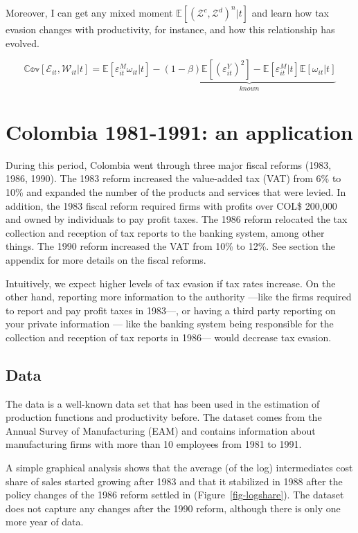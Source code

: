 \documentclass[
  12pt]{article}
\theoremstyle{definition}
\theoremstyle{remark}
\begin{document}
Moreover, I can get any mixed moment
\(\mathbb{E}[(\mathcal{Z}^c, \mathcal{Z}^d)^n|t]\) and learn how tax
evasion changes with productivity, for instance, and how this
relationship has evolved.

\[
\mathbb{Cov}[\mathcal{E}_{it},\mathcal{W}_{it}|t]=\mathbb{E}[\varepsilon^M_{it}\omega_{it}|t]
-\underbrace{
(1-\beta)\mathbb{E}[(\varepsilon^{Y}_{it})^2]-\mathbb{E}[\varepsilon^M_{it}|t]\mathbb{E}[\omega_{it}|t]}_{
known
}
\]

\hypertarget{colombia-1981-1991-an-application}{%
\section{Colombia 1981-1991: an
application}\label{colombia-1981-1991-an-application}}

During this period, Colombia went through three major fiscal reforms
(1983, 1986, 1990). The 1983 reform increased the value-added tax (VAT)
from 6\% to 10\% and expanded the number of the products and services
that were levied. In addition, the 1983 fiscal reform required firms
with profits over COL\$ 200,000 and owned by individuals to pay profit
taxes. The 1986 reform relocated the tax collection and reception of tax
reports to the banking system, among other things. The 1990 reform
increased the VAT from 10\% to 12\%. See section the appendix for more
details on the fiscal reforms.

Intuitively, we expect higher levels of tax evasion if tax rates
increase. On the other hand, reporting more information to the authority
---like the firms required to report and pay profit taxes in 1983---, or
having a third party reporting on your private information --- like the
banking system being responsible for the collection and reception of tax
reports in 1986--- would decrease tax evasion.

\hypertarget{data}{%
\subsection{Data}\label{data}}

The data is a well-known data set that has been used in the estimation
of production functions and productivity before. The dataset comes from
the Annual Survey of Manufacturing (EAM) and contains information about
manufacturing firms with more than 10 employees from 1981 to 1991.

A simple graphical analysis shows that the average (of the log)
intermediates cost share of sales started growing after 1983 and that it
stabilized in 1988 after the policy changes of the 1986 reform settled
in (Figure~\ref{fig-logshare}). The dataset does not capture any changes
after the 1990 reform, although there is only one more year of data.
\end{document}
